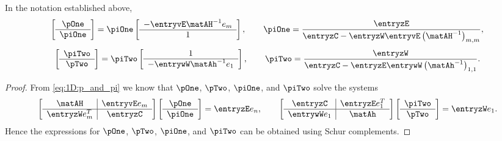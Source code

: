 \begin{lemma} \label{lem:pp}
In the notation established above,
%
$$\left[\begin{array}{c}\pOne \\\hline \piOne\end{array}\right]
= \piOne \left[\begin{array}{c}-\entryvE \matAH^{-1}e_{m } \\
\hline 1\end{array}\right],\qquad
\piOne=\frac{\entryzE }{\entryzC -\entryzW \entryvE  \left(\matAH ^{-1}\right)_{m,m}},$$
%
$$\left[\begin{array}{c} \piTwo\\\hline \pTwo\end{array}\right]=
\piTwo \left[\begin{array}{c}1 \\
\hline -\entrywW\matAh ^{-1}e_1\end{array}\right],\qquad
\piTwo=\frac{\entryzW }{\entryzC - \entryzE \entrywW \left(\matAh ^{-1}\right)_{1,1}}.$$
%
\end{lemma}

\begin{proof}
From \eqref{eq:1D:p_and_pi} we know that $\pOne$, $\pTwo$, $\piOne$, and $\piTwo$
solve the %
systems
%
\begin{equation*}%
\left[\begin{array}{c|c}\matAH &\entryvE  e_{m }\\\hline \entryzW e_{m }^T&\entryzC  \end{array}\right]
\left[\begin{array}{c}\pOne \\\hline \piOne\end{array}\right]
=\entryzE e_n,\qquad
\left[\begin{array}{c|c}\entryzC &\entryzE  e_{1}^T\\\hline \entrywW e_{1}&  \matAh\end{array}\right]
\left[\begin{array}{c}\piTwo \\\hline \pTwo\end{array}\right]
=\entryzW e_1.
\end{equation*}
%
Hence the expressions for  $\pOne$, $\pTwo$, $\piOne$, and $\piTwo$ can be
obtained using Schur complements.
\end{proof}

